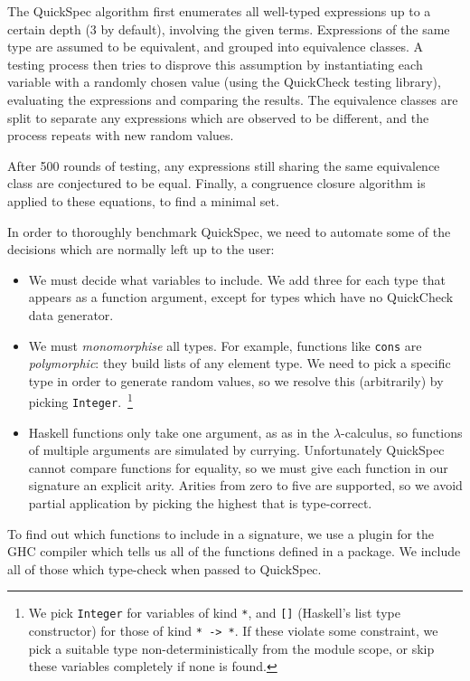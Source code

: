 The QuickSpec algorithm first enumerates all well-typed expressions up to a
certain depth (3 by default), involving the given terms. Expressions of the same
type are assumed to be equivalent, and grouped into equivalence classes. A
testing process then tries to disprove this assumption by instantiating each
variable with a randomly chosen value (using the QuickCheck testing library),
evaluating the expressions and comparing the results. The equivalence classes
are split to separate any expressions which are observed to be different, and
the process repeats with new random values.

After 500 rounds of testing, any expressions still sharing the same equivalence
class are conjectured to be equal. Finally, a congruence closure algorithm is
applied to these equations, to find a minimal set.

In order to thoroughly benchmark QuickSpec, we need to automate some of the
decisions which are normally left up to the user:

\begin{itemize}
\item We must decide what variables to include. We add three for each type that
  appears as a function argument, except for types which have no QuickCheck data
  generator.
\item We must \emph{monomorphise} all types. For example, functions like
  \texttt{cons} are \emph{polymorphic}: they build lists of any element type.
  We need to pick a specific type in order to generate random values, so we
  resolve this (arbitrarily) by picking
  \texttt{Integer}.~\footnote{We pick \texttt{Integer} for variables of kind
    \texttt{*}, and \texttt{[]} (Haskell's list type constructor) for those of
    kind \texttt{* -> *}. If these violate some constraint, we pick a suitable
    type non-deterministically from the module scope, or skip these variables
    completely if none is found.}
\item Haskell functions only take one argument, as as in the $\lambda$-calculus,
  so functions of multiple arguments are simulated by currying.
  Unfortunately QuickSpec cannot compare functions for equality, so we must give
  each function in our signature an explicit arity. Arities from zero to five
  are supported, so we avoid partial application by picking the highest that is
  type-correct.
\end{itemize}

To find out which functions to include in a signature, we use a plugin for the
GHC compiler which tells us all of the functions defined in a package. We
include all of those which type-check when passed to QuickSpec.

